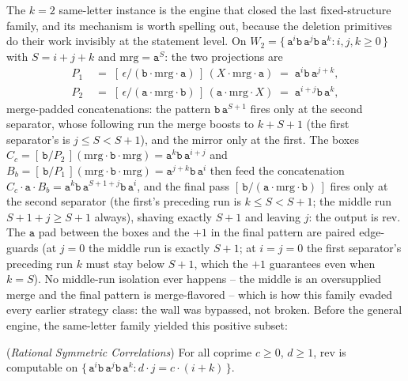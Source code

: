 \documentclass[runningheads,envcountsect]{llncs}
\begin{document}
The $k = 2$ same-letter instance is the engine that closed the last fixed-structure family, and its mechanism is worth spelling out, because the deletion primitives do their work invisibly at the statement level. On $W_2 = \{\, \mathtt a^i \mathtt b\, \mathtt a^j \mathtt b\, \mathtt a^k : i, j, k \geq 0 \,\}$ with $S = i + j + k$ and $\mathrm{mrg} = \mathtt a^S$: the two projections are
\begin{align*}
    P_1 \;&=\; [\,\epsilon/(\mathtt b \cdot \mathrm{mrg} \cdot \mathtt a)\,]\,(X \cdot \mathrm{mrg} \cdot \mathtt a) \;=\; \mathtt a^i \mathtt b\, \mathtt a^{j+k},\\
    P_2 \;&=\; [\,\epsilon/(\mathtt a \cdot \mathrm{mrg} \cdot \mathtt b)\,]\,(\mathtt a \cdot \mathrm{mrg} \cdot X) \;=\; \mathtt a^{i+j} \mathtt b\, \mathtt a^k,
\end{align*}
merge-padded concatenations: the pattern $\mathtt b\,\mathtt a^{S+1}$ fires only at the second separator, whose following run the merge boosts to $k + S + 1$ (the first separator's is $j \leq S < S + 1$), and the mirror only at the first. The boxes $C_c = [\,\mathtt b/P_2\,](\mathrm{mrg} \cdot \mathtt b \cdot \mathrm{mrg}) = \mathtt a^k \mathtt b\, \mathtt a^{i+j}$ and $B_b = [\,\mathtt b/P_1\,](\mathrm{mrg} \cdot \mathtt b \cdot \mathrm{mrg}) = \mathtt a^{j+k} \mathtt b\, \mathtt a^i$ then feed the concatenation $C_c \cdot \mathtt a \cdot B_b = \mathtt a^k \mathtt b\, \mathtt a^{S+1+j} \mathtt b\, \mathtt a^i$, and the final pass $[\,\mathtt b/(\mathtt a \cdot \mathrm{mrg} \cdot \mathtt b)\,]$ fires only at the second separator (the first's preceding run is $k \leq S < S + 1$; the middle run $S + 1 + j \geq S + 1$ always), shaving exactly $S + 1$ and leaving $j$: the output is $\mathrm{rev}$. The $\mathtt a$ pad between the boxes and the $+1$ in the final pattern are paired edge-guards (at $j = 0$ the middle run is exactly $S + 1$; at $i = j = 0$ the first separator's preceding run $k$ must stay below $S + 1$, which the $+1$ guarantees even when $k = S$). No middle-run isolation ever happens -- the middle is an oversupplied merge and the final pattern is merge-flavored -- which is how this family evaded every earlier strategy class: the wall was bypassed, not broken. Before the general engine, the same-letter family yielded this positive subset:

\begin{theorem}
    (\emph{Rational Symmetric Correlations})
    \label{thm:correlations}
    For all coprime $c \geq 0$, $d \geq 1$, $\mathrm{rev}$ is computable on
    $\{\, \mathtt a^i \mathtt b\, \mathtt a^{j} \mathtt b\, \mathtt a^k : d \cdot j = c \cdot (i + k) \,\}$.
\end{theorem}
\end{document}
